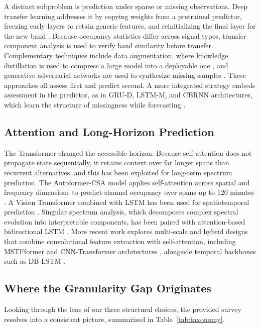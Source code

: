 \documentclass[lettersize,journal]{IEEEtran}
\begin{document}
A distinct subproblem is prediction under sparse or missing
observations.
Deep transfer learning addresses it by copying weights
from a pretrained predictor, freezing early layers to retain generic
features, and reinitializing the final layer for the new band
\cite{Li2023}.
Because occupancy statistics differ across signal types,
transfer component analysis is used to verify band similarity before
transfer.
Complementary techniques include data augmentation, where knowledge
distillation is used to compress a large model into a deployable one
\cite{Cheng2023, Hinton2015}, and generative adversarial networks are used to
synthesize missing samples \cite{Lin2021}.
These approaches all assess first and predict second. A more integrated strategy
embeds assessment in the predictor, as in GRU-D, LSTM-M,
and CBRNN architectures, which learn the structure of missingness while
forecasting \cite{Wang2024}.

\subsection{\textbf{Attention and Long-Horizon Prediction}}
The Transformer \cite{Vaswani2017} changed the accessible horizon.
Because self-attention does not propagate state sequentially, it retains
context over far longer spans than recurrent alternatives, and this has
been exploited for long-term spectrum prediction.
The Autoformer-CSA model applies self-attention across spatial and frequency
dimensions to predict channel occupancy over spans up to 120 minutes
\cite{Pan2023}. A Vision Transformer combined with LSTM has been used for
spatiotemporal prediction \cite{Pan2026}.
Singular spectrum analysis, which decomposes
complex spectral evolution into interpretable components, has been
paired with attention-based bidirectional LSTM \cite{Ben2025}.
More recent work explores multi-scale and hybrid designs that combine
convolutional feature extraction with self-attention, including
MSTFformer \cite{Li2025} and CNN-Transformer architectures
\cite{Guan2025}, alongside temporal backbones such as DB-LSTM
\cite{Xu2024}.

\subsection{\textbf{Where the Granularity Gap Originates}}
Looking through the lens of our three structural choices, the provided survey
resolves into a consistent picture, summarized in
Table~\ref{tab:taxonomy}.
\end{document}
